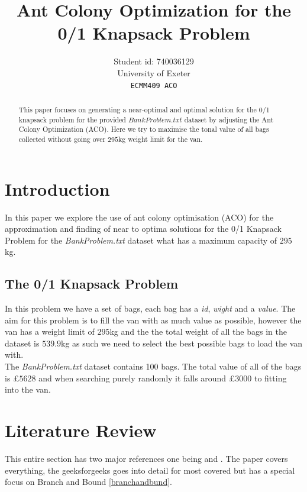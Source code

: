 \documentclass[11pt]{article}
\title{Ant Colony Optimization for the 0/1 Knapsack Problem}
\author{Student id: 740036129  \\
  University of Exeter \\
  {\tt ECMM409 ACO} \\}
\date{}
\begin{document}
\maketitle

\begin{abstract}
    \noindent This paper focuses on generating a near-optimal and optimal solution for the 0/1 knapsack problem for the provided $BankProblem.txt$ dataset by adjusting the Ant Colony Optimization (ACO). Here we try to maximise the tonal value of all bags collected without going over $295$kg weight limit for the van.
\end{abstract}

\section{Introduction}

In this paper we explore the use of ant colony optimisation (ACO) for the approximation and finding of near to optima solutions for the 0/1 Knapsack Problem for the \textit{BankProblem.txt} dataset what has a maximum capacity of $295$kg. 

\subsection{The 0/1 Knapsack Problem}

In this problem we have a set of bags, each bag has a \textit{id}, \textit{wight} and a \textit{value}. The aim for this problem is to fill the van with as much value as possible, however the van has a weight limit of $295$kg and the the total weight of all the bags in the dataset is $539.9$kg as such we need to select the best possible bags to load the van with. \\

\noindent The \textit{BankProblem.txt} dataset contains 100 bags. The total value of all of the bags is £$5628$ and when searching purely randomly it falls around £3000 to fitting into the van.

\section{Literature Review}

This entire section has two major references one being \cite{hristakeva_shrestha_2005} and \cite{branch_and_bond_2024}. The paper covers everything, the geeksforgeeks goes into detail for most covered but has a special focus on Branch and Bound \ref{branchandbund}.
\end{document}
